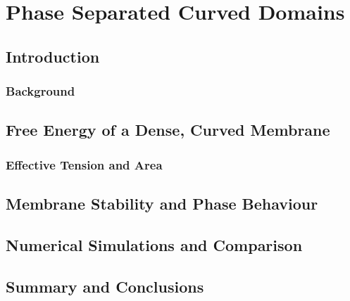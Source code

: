 \chapter{\label{ch:4-coupled}Phase Separated Curved Domains} 

\minitoc
\newpage
\section{Introduction}
\subsection{Background}

\section{Free Energy of a Dense, Curved Membrane}
\subsection{Effective Tension and Area}

\section{Membrane Stability and Phase Behaviour}

\section{Numerical Simulations and Comparison}

\section{Summary and Conclusions}
